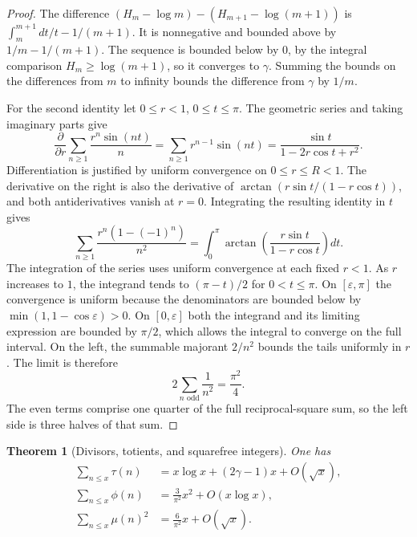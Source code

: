 \documentclass[11pt,oneside,openany]{book}
\theoremstyle{plain}
\newtheorem{theorem}{Theorem}[chapter]
\theoremstyle{definition}
\theoremstyle{remark}
\begin{document}
\begin{proof}
The difference \((H_m-\log m)-(H_{m+1}-\log(m+1))\) is
\(\int_m^{m+1} dt/t-1/(m+1)\). It is nonnegative and bounded above by
\(1/m-1/(m+1)\). The sequence is bounded below by \(0\), by the integral
comparison \(H_m\ge\log(m+1)\), so it converges to \(\gamma\). Summing
the bounds on the differences from \(m\) to infinity bounds the
difference from \(\gamma\) by \(1/m\).

For the second identity let \(0\le r<1\), \(0\le t\le\pi\). The geometric
series and taking imaginary parts give
\[
 \frac{\partial}{\partial r}
    \sum_{n\ge1}\frac{r^n\sin(nt)}{n}
 =\sum_{n\ge1}r^{n-1}\sin(nt)
 =\frac{\sin t}{1-2r\cos t+r^2}.
\]
Differentiation is justified by uniform convergence on
\(0\le r\le R<1\). The derivative on the right is also the derivative
of \(\arctan(r\sin t/(1-r\cos t))\), and both antiderivatives vanish
at \(r=0\). Integrating the resulting identity in \(t\) gives
\[
 \sum_{n\ge1}\frac{r^n(1-(-1)^n)}{n^2}
 =\int_0^\pi \arctan\!\left(\frac{r\sin t}{1-r\cos t}\right)dt .
\]
The integration of the series uses uniform convergence at each fixed
\(r<1\). As \(r\) increases to \(1\), the integrand tends to
\((\pi-t)/2\) for \(0<t\le\pi\). On \([\varepsilon,\pi]\) the
convergence is uniform because the denominators are bounded below by
\(\min(1,1-\cos\varepsilon)>0\). On \([0,\varepsilon]\) both the
integrand and its limiting expression are bounded by \(\pi/2\), which
allows the integral to converge on the full interval. On the left,
the summable majorant \(2/n^2\) bounds the tails uniformly in \(r\).
The limit is therefore
\[
 2\sum_{n\text{ odd}}\frac1{n^2}=\frac{\pi^2}{4}.
\]
The even terms comprise one quarter of the full reciprocal-square
sum, so the left side is three halves of that sum.
\end{proof}

\begin{theorem}[Divisors, totients, and squarefree integers]\label{nt:C07}
One has
\begin{align*}
 \sum_{n\le x}\tau(n)&=x\log x+(2\gamma-1)x+O(\sqrt{x}),\\
 \sum_{n\le x}\phi(n)&=\frac{3}{\pi^2}x^2+O(x\log x),\\
 \sum_{n\le x}\mu(n)^2&=\frac{6}{\pi^2}x+O(\sqrt{x}).
\end{align*}
\end{theorem}
\end{document}
